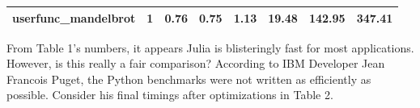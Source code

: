 \documentclass[12pt]{article}
\begin{document}
\begin{center}
\begin{table}[ht]
\begin{tabular}{|l|c|c|c|c|c|c|c|}
\textbf{userfunc\_mandelbrot} & 1                                                                & 0.76                                                           & 0.75                                                                 & 1.13                                                              & 19.48                                                                 & 142.95                                                          & 347.41                                                     \\ \hline
\end{tabular}
\end{table}
\end{center}

From Table 1's numbers, it appears Julia is blisteringly fast for most applications. However, is this really a fair comparison? According to IBM Developer Jean Francois Puget, the Python benchmarks were not written as efficiently as possible. Consider his final timings after optimizations in Table 2\cite{pugetdevworks}.
\end{document}

